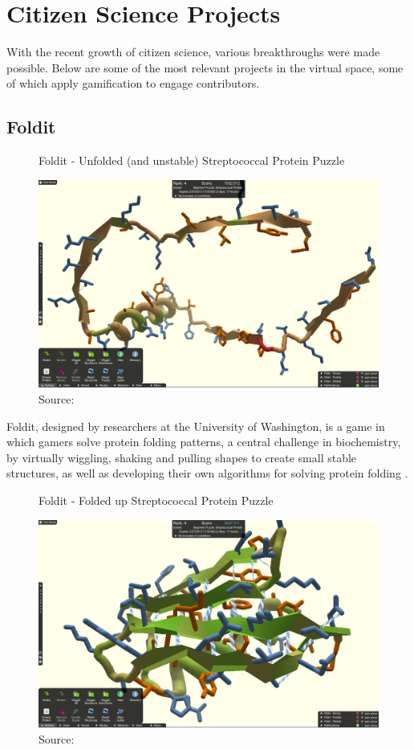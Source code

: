 \section{Citizen Science Projects}

With the recent growth of citizen science, various breakthroughs were made possible. Below are some of the most relevant projects in the virtual space, some of which apply gamification to engage contributors.

\subsection{Foldit}

\begin{figure}[ht]
    \centering
    \caption{Foldit - Unfolded (and unstable) Streptococcal Protein Puzzle}
    \includegraphics[width=0.8\linewidth]{images/background/foldit-problem.png}
    \caption*{Source: \cite{foldit-protein-problem}}
    \label{fig:foldit-problem}
\end{figure}

Foldit, designed by researchers at the University of Washington, is a game in which gamers solve protein folding patterns, a central challenge in biochemistry, by virtually wiggling, shaking and pulling shapes to create small stable structures, as well as developing their own algorithms for solving protein folding \cite{bourzac2008enlisting}. 

\begin{figure}[ht]
    \centering
    \caption{Foldit - Folded up Streptococcal Protein Puzzle}
    \includegraphics[width=0.8\linewidth]{images/background/foldit-solution.png}
    \caption*{Source: \cite{foldit-protein-solution}}
    \label{fig:foldit-solution}
\end{figure}

